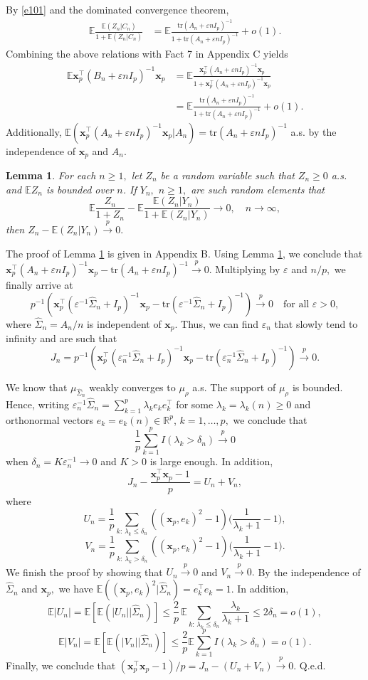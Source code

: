 \documentclass[12pt, a4paper]{article}
\newcommand\x{\mathbf x}
\newcommand\bR{{\mathbb R}}
\newcommand\wh{\widehat }
\newcommand\pto{\stackrel p\rightarrow}
\newcommand\e{{\mathbb E}}
\newcommand\tr{{\mathrm{tr}}}
\newtheorem{lemma}[theorem]{Lemma}%
\begin{document}
By \eqref{e101} and the dominated convergence theorem,  
\begin{align*}
\e\frac{\e(Z_n|C_n)}{1+\e(Z_n|C_n)}&=\e\frac{ \tr(A_n +\varepsilon nI_p)^{-1}}{1+ \tr(A_n +\varepsilon nI_p)^{-1}}+o(1).
\end{align*}
Combining the above relations with Fact 7 in Appendix C yields
\begin{align*}\e \x_p^\top(B_n +\varepsilon nI_p)^{-1}\x_p&=\e\frac{ \x_p^\top(A_n +\varepsilon nI_p)^{-1}\x_p}{1+\x_p^\top(A_n +\varepsilon nI_p)^{-1}\x_p}\\
&=\e\frac{ \tr(A_n +\varepsilon nI_p)^{-1}}{1+ \tr(A_n +\varepsilon nI_p)^{-1}}+o(1).
\end{align*}
Additionally,  $\e(\x_p^\top (A_n +\varepsilon nI_p)^{-1}\x_p |A_n)=\tr(A_n +\varepsilon nI_p)^{-1}$ a.s. by the independence of $\x_p$ and $A_n.$ 
\begin{lemma} \label{l4}
For each $n\geqslant 1,$ let $Z_n$ be a random variable such that $Z_n\geqslant 0$ a.s. and $\e Z_n$ is bounded over $n$. If $Y_n,$ $n\geqslant 1,$ are such random elements that 
\[\e\frac{Z_n}{1+Z_n}-\e\frac{\e (Z_n|Y_n) }{1+\e (Z_n|Y_n)}\to 0,\quad n\to\infty,\]
then $Z_n-\e(Z_n|Y_n) \pto0.$
\end{lemma}
The proof of Lemma \ref{l4} is given in Appendix B. Using Lemma \ref{l4}, we conclude that
$\x_p^\top(A_n +\varepsilon nI_p)^{-1}\x_p-\tr(A_n +\varepsilon nI_p)^{-1}\pto 0.$
Multiplying by $\varepsilon$ and $n/p,$ we finally arrive at 
\[p^{-1}(\x_p^\top(\varepsilon^{-1}\wh\Sigma_n + I_p)^{-1}\x_p-\tr(\varepsilon^{-1}\wh\Sigma_n +I_p)^{-1})\pto 0\quad\text{for all $\varepsilon>0,$}\]
where $\wh\Sigma_n=A_n/n$ is independent of $\x_p$.
Thus, we can find $\varepsilon_n$ that slowly tend to infinity and are such that
\[J_n=p^{-1}(\x_p^\top(\varepsilon_n^{-1}\wh\Sigma_n + I_p)^{-1}\x_p-\tr(\varepsilon_n^{-1}\wh\Sigma_n +I_p)^{-1})\pto 0.\]

We know that  $\mu_{\wh\Sigma_n}$ weakly converges to $\mu_\rho$ a.s. The support of $\mu_\rho$ is bounded. Hence,
writing $\varepsilon_n^{-1}\wh\Sigma_n=\sum_{k=1}^p\lambda_ke_ke_k^\top$ for some $\lambda_k=\lambda_k(n)\geqslant0$ and  orthonormal vectors $e_k=e_k(n)\in\bR^p$, $k=1,\ldots,p,$ we conclude that  
\[\frac{1}{p}\sum_{k=1}^pI(\lambda_k>\delta_n)\pto0\]
when $\delta_n=K\varepsilon_n^{-1}\to0$ and $K>0$ is large enough.  In addition,
\[J_n-\frac{\x_p^\top \x_p-1}{p}=U_n+V_n,\]
where 
\[U_n=\frac{1}{p}\sum_{k:\,\lambda_k\leqslant\delta_n}((\x_p,e_k)^2-1)\bigg(\frac{1}{\lambda_k+1}-1\bigg),\]
\[V_n=\frac{1}{p}\sum_{k:\,\lambda_k>\delta_n}((\x_p,e_k)^2-1)\bigg(\frac{1}{\lambda_k+1}-1\bigg).\]
We finish the proof by showing that $U_n\pto 0$ and $V_n\pto0.$
By the independence of $\wh\Sigma_n$ and $\x_p,$  we have $\e((\x_p,e_k)^2|\wh\Sigma_n)=e_k^\top e_k=1$. In addition, \[\e |U_n|=\e[ \e(|U_n||\wh\Sigma_n)]\leqslant \frac{2}p\,\e\sum_{k:\,\lambda_k\leqslant\delta_n}\frac
{\lambda_k}{\lambda_k+1}\leqslant 2\delta_n=o(1),\]
\[\e |V_n|=\e[ \e(|V_n||\wh\Sigma_n)]\leqslant \frac{2}p\e\sum_{k=1}^p I(\lambda_k>\delta_n)=o(1).\]
Finally, we conclude that $( \x_p^\top \x_p-1)/p=J_n-(U_n+V_n)\pto0.$ Q.e.d.
\end{document}
